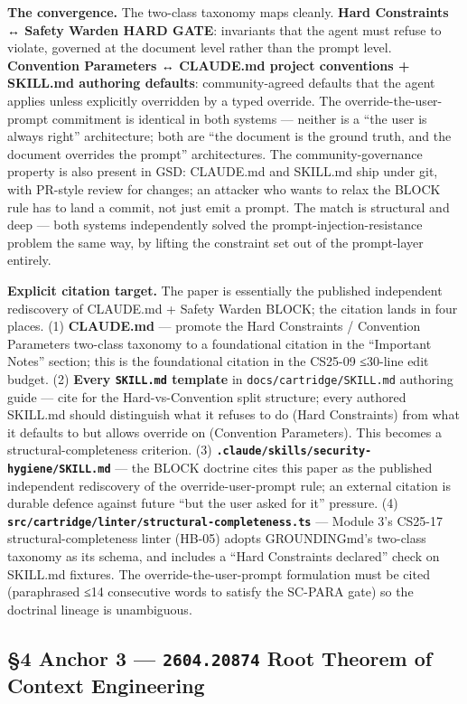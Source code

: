 \documentclass[11pt,letterpaper]{article}
\newcommand{\arxivid}[1]{\texttt{\textcolor{accent}{#1}}}
\begin{document}
\textbf{The convergence.} The two-class taxonomy maps cleanly.
\textbf{Hard Constraints ↔ Safety Warden HARD GATE}: invariants that the
agent must refuse to violate, governed at the document level rather than
the prompt level. \textbf{Convention Parameters ↔ CLAUDE.md project
conventions + SKILL.md authoring defaults}: community-agreed defaults
that the agent applies unless explicitly overridden by a typed override.
The override-the-user-prompt commitment is identical in both systems ---
neither is a ``the user is always right'' architecture; both are ``the
document is the ground truth, and the document overrides the prompt''
architectures. The community-governance property is also present in GSD:
CLAUDE.md and SKILL.md ship under git, with PR-style review for changes;
an attacker who wants to relax the BLOCK rule has to land a commit, not
just emit a prompt. The match is structural and deep --- both systems
independently solved the prompt-injection-resistance problem the same
way, by lifting the constraint set out of the prompt-layer entirely.

\textbf{Explicit citation target.} The paper is essentially the
published independent rediscovery of CLAUDE.md + Safety Warden BLOCK;
the citation lands in four places. (1) \textbf{CLAUDE.md} --- promote
the Hard Constraints / Convention Parameters two-class taxonomy to a
foundational citation in the ``Important Notes'' section; this is the
foundational citation in the CS25-09 ≤30-line edit budget. (2)
\textbf{Every \texttt{SKILL.md} template} in
\texttt{docs/cartridge/SKILL.md} authoring guide --- cite for the
Hard-vs-Convention split structure; every authored SKILL.md should
distinguish what it refuses to do (Hard Constraints) from what it
defaults to but allows override on (Convention Parameters). This becomes
a structural-completeness criterion. (3)
\textbf{\texttt{.claude/skills/security-hygiene/SKILL.md}} --- the BLOCK
doctrine cites this paper as the published independent rediscovery of
the override-user-prompt rule; an external citation is durable defence
against future ``but the user asked for it'' pressure. (4)
\textbf{\texttt{src/cartridge/linter/structural-completeness.ts}} ---
Module 3's CS25-17 structural-completeness linter (HB-05) adopts
GROUNDINGmd's two-class taxonomy as its schema, and includes a ``Hard
Constraints declared'' check on SKILL.md fixtures. The
override-the-user-prompt formulation must be cited (paraphrased ≤14
consecutive words to satisfy the SC-PARA gate) so the doctrinal lineage
is unambiguous.

\subsection{\texorpdfstring{§4 Anchor 3 --- \arxivid{2604.20874} Root
Theorem of Context
Engineering}{§4 Anchor 3 --- \arxivid{2604.20874} Root Theorem of Context Engineering}}
\end{document}

